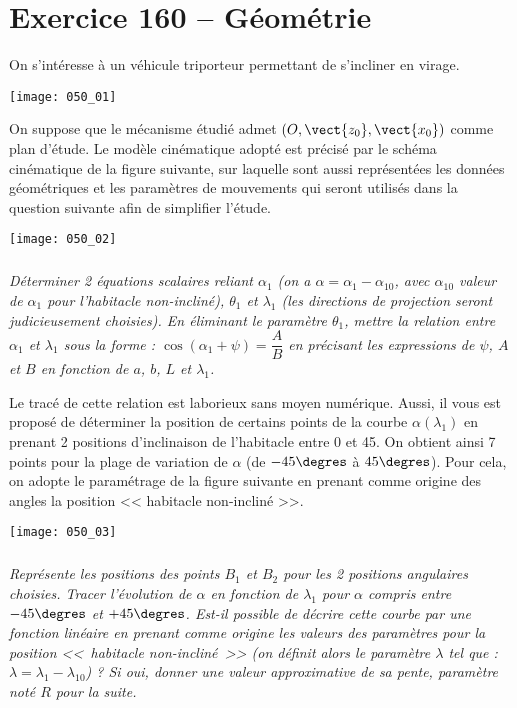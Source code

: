 \section*{Exercice 160 -- Géométrie}

\setcounter{exo}{0}
On s'intéresse à un véhicule triporteur permettant de s'incliner en virage.
\begin{center}
\texttt{[image: 050\_01]}
\end{center}

On suppose que le mécanisme étudié admet  $\left(O,\vect{z_0},\vect{x_0} \right)$ comme plan d'étude. Le modèle cinématique adopté est précisé par le schéma cinématique de la figure suivante, sur laquelle sont aussi représentées les données géométriques et les paramètres de mouvements qui seront utilisés dans la question suivante afin de simplifier l'étude.


\begin{center}
\texttt{[image: 050\_02]}
\end{center}
 
\subparagraph{}
\textit{Déterminer 2 équations scalaires reliant $\alpha_1$ (on a $\alpha=\alpha_1-\alpha_{10}$, avec $\alpha_{10}$ valeur de $\alpha_{1}$ pour l'habitacle non-incliné), $\theta_1$ et $\lambda_1$ (les directions de projection seront judicieusement choisies). En éliminant le paramètre $\theta_1$, mettre la relation entre $\alpha_{1}$ et $\lambda_1$ sous la forme :
$\cos\left(\alpha_1+\psi\right)=\dfrac{A}{B}$ en précisant les expressions de $\psi$, $A$ et $B$ en fonction de $a$, $b$, $L$ et $\lambda_1$.}
\ifprof
\begin{corrige}

\end{corrige}
\else
\fi


Le tracé de cette relation est laborieux sans moyen numérique. Aussi, il vous est proposé de déterminer la position de
certains points de la courbe $\alpha\left( \lambda_1 \right)$ en prenant 2 positions d'inclinaison de l'habitacle entre 0 et
45\degres. On obtient ainsi 7 points pour la plage de variation de $\alpha$ (de $- 45\degres$ à $45\degres$). Pour cela,
on adopte le paramétrage 
de la figure suivante
en prenant comme origine des angles la position 
<< habitacle non-incliné >>.

\begin{center}
\texttt{[image: 050\_03]}
\end{center}
 

\subparagraph{}
\textit{Représente les positions des points $B_1$ et $B_2$ pour les 2 positions angulaires choisies. Tracer l'évolution de $\alpha$ en fonction de $\lambda_1$ pour $\alpha$ compris entre $- 45\degres$ et $+ 45\degres$. Est-il possible de décrire cette courbe par une fonction linéaire en prenant comme origine les valeurs des paramètres pour la position <<~habitacle non-incliné~>> (on définit alors le paramètre $\lambda$ tel que : $\lambda = \lambda_1 - \lambda_{10}$) ? Si oui, donner une valeur approximative de sa pente, paramètre noté $R$ pour la suite.}
\ifprof
\begin{corrige}
\end{corrige}
\else
\fi
